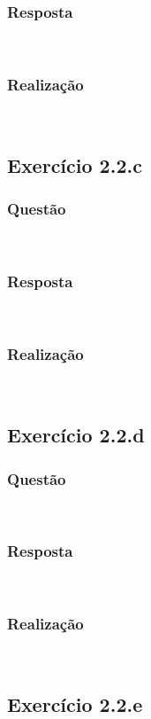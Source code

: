 \documentclass{llncs}
\begin{document}
\subsubsection{Resposta}\rule[-10pt]{0pt}{10pt}\\
\subsubsection{Realização}\rule[-10pt]{0pt}{10pt}\\

\subsection{Exercício 2.2.c}
\subsubsection{Questão}\rule[-10pt]{0pt}{10pt}\\
\subsubsection{Resposta}\rule[-10pt]{0pt}{10pt}\\
\subsubsection{Realização}\rule[-10pt]{0pt}{10pt}\\

\subsection{Exercício 2.2.d}
\subsubsection{Questão}\rule[-10pt]{0pt}{10pt}\\
\subsubsection{Resposta}\rule[-10pt]{0pt}{10pt}\\
\subsubsection{Realização}\rule[-10pt]{0pt}{10pt}\\

\subsection{Exercício 2.2.e}
\end{document}
